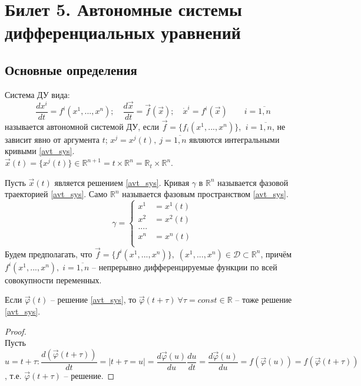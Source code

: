 
\section{Билет 5. Автономные системы дифференциальных уравнений}

\subsection{Основные определения}
Система ДУ вида: 
\begin{equation}\label{avt_sys}
	\frac{dx^i}{dt} = f^i(x^1, ..., x^n); \quad \frac{d\vec{x}}{dt} = \vec{f}(\vec{x}); \quad 	\dot{x}^i = f^i(\vec{x}) \quad \quad i = \overline{1, n}
\end{equation}
называется автономной системой ДУ, если $ \vec{f} = \{f_i(x^1, ..., x^n)\} $,  $\ i = \overline{1, n}$, не зависит явно от аргумента $ t $; $ x^j = x^j(t), \ j = \overline{1, n} $ являются интегральными кривыми \eqref{avt_sys}. \\ $\vec{x}(t) = \{ x^j(t) \} \in \mathbb{R}^{n+1} = t \times \mathbb{R}^n = \mathbb{R}_t \times \mathbb{R}^n$.
\begin{definition}
	Пусть $ \vec{x}(t) $ является решением \eqref{avt_sys}. Кривая $ \gamma $ в $ \mathbb{R}^n $ называется фазовой траекторией \eqref{avt_sys}. Само $ \mathbb{R}^n $ называется фазовым пространством \eqref{avt_sys}.
	\begin{equation}\label{gamma_sys}
		\gamma = \left\{
			\begin{aligned}
				x^1 &= x^1(t) \\
				x^2 &=x^2(t) \\
				.... \\
				x^n &= x^n(t) \\
			\end{aligned}
		\right.
	\end{equation}
	Будем предполагать, что $ \vec{f} = \{ f^i(x^1, ..., x^n) \}, \; (x^1, ..., x^n) \in \mathscr{D} \subset \mathbb{R}^n$, причём $f^i(x^1, ..., x^n), \; i = \overline{1, n} $ -- непрерывно дифференцируемые функции по всей совокупности переменных.
\end{definition}

\begin{theorem}
	Если $ \vec \varphi(t) $ -- решение \eqref{avt_sys}, то $ \vec \varphi(t + \tau) \ \forall \tau = const \in \mathbb{R}$ -- тоже решение \eqref{avt_sys}.
\end{theorem}

\begin{proof}
	\ \\
	Пусть $ u = t + \tau: \dfrac{d(\vec \varphi(t + \tau))}{dt} = | t + \tau = u | = \dfrac{d \vec \varphi(u)}{du} \dfrac{du}{dt} = \dfrac{d \vec \varphi(u)}{du} = f(\vec \varphi(u)) = f(\vec \varphi(t + \tau))$, т.е. $\vec \varphi(t + \tau)$ -- решение.
\end{proof}

